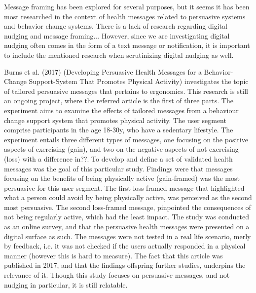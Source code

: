 Message framing has been explored for several purposes, but it seems it has been most researched in the context of health messages related to persuasive systems and behavior change systems. There is a lack of research regarding digital nudging and message framing... However, since we are investigating digital nudging often comes in the form of a text message or notification, it is important to include the mentioned research when scrutinizing digital nudging as well. 

Burns et al. (2017) (Developing Persuasive Health Messages for a Behavior-Change Support-System That Promotes Physical Activity) investigates the topic of tailored persuasive messages that pertains to ergonomics. This research is still an ongoing project, where the referred article is the first of three parts. The experiment aims to examine the effects of tailored messages from a behaviour change support system that promotes physical activity. The user segment comprise participants in the age 18-30y, who have a sedentary lifestyle. The experiment entails three different types of messages, one focusing on the positive aspects of exercising (gain), and two on the negative aspects of not exercising (loss) with a difference in??. To develop and define a set of validated health messages was the goal of this particular study. Findings were that messages focusing on the benefits of being physically active (gain-framed) was the most persuasive for this user segment. The first loss-framed message that highlighted what a person could avoid by being physically active, was perceived as the second most persuasive. The second loss-framed message, pinpointed the consequences of not being regularly active, which had the least impact. The study was conducted as an online survey, and that the persuasive health messages were presented on a digital surface as such. The messages were not tested in a real life scenario, merly by feedback, i.e. it was not checked if the users actually responded in a physical manner (however this is hard to measure). The fact that this article was published in 2017, and that the findings offspring further studies, underpins the relevance of it. Though this study focuses on persuasive messages, and not nudging in particular, it is still relatable.

